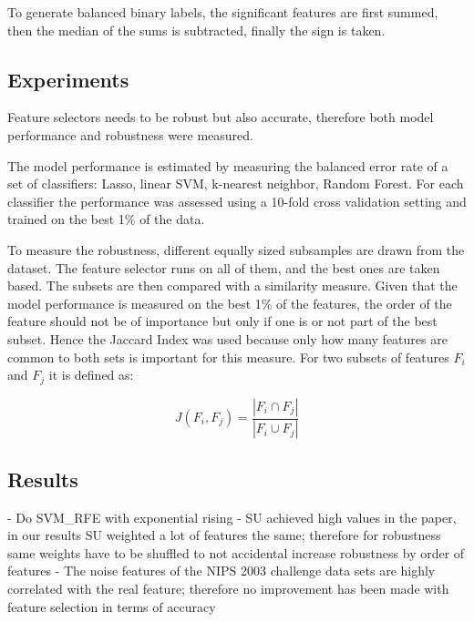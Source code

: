 \documentclass[twoside,11pt]{article}
\begin{document}
To generate balanced binary labels, the significant features are first summed, then the median of the sums is subtracted, finally the sign is taken. 





\subsection{Experiments}

Feature selectors needs to be robust but also accurate, therefore both model performance and robustness were measured.

The model performance is estimated by measuring the balanced error rate of a set of classifiers: Lasso, linear SVM, k-nearest neighbor, Random Forest. For each classifier the performance was assessed using a 10-fold cross validation setting and trained on the best 1\% of the data.

To measure the robustness, different equally sized subsamples are drawn from the dataset. The feature selector runs on all of them, and the best ones are taken based. The subsets are then compared with a similarity measure. Given that the model performance is measured on the best 1\% of the features, the order of the feature should not be of importance but only if one is or not part of the best subset. Hence the Jaccard Index was used because only how many features are common to both sets is important for this measure. For two subsets of features $F_i$ and $F_j$ it is defined as:

\begin{equation}
J(F_i, F_j) = \frac{| F_i \cap F_j |}{| F_i \cup F_j |}
\end{equation}

\subsection{Results}
- Do SVM\_RFE with exponential rising
- SU achieved high values in the paper, in our results SU weighted a lot of features the 
same; therefore for robustness same weights have to be shuffled to not accidental increase
robustness by order of features
- The noise features of the NIPS 2003 challenge data sets are highly correlated with the
real feature; therefore no improvement has been made with feature selection in terms of 
accuracy

\end{document}
